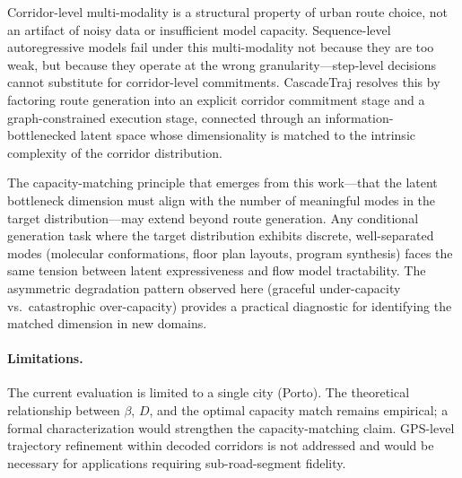 
Corridor-level multi-modality is a structural property of urban route choice, not an artifact of noisy data or insufficient model capacity.
Sequence-level autoregressive models fail under this multi-modality not because they are too weak, but because they operate at the wrong granularity---step-level decisions cannot substitute for corridor-level commitments.
CascadeTraj resolves this by factoring route generation into an explicit corridor commitment stage and a graph-constrained execution stage, connected through an information-bottlenecked latent space whose dimensionality is matched to the intrinsic complexity of the corridor distribution.

The capacity-matching principle that emerges from this work---that the latent bottleneck dimension must align with the number of meaningful modes in the target distribution---may extend beyond route generation.
Any conditional generation task where the target distribution exhibits discrete, well-separated modes (molecular conformations, floor plan layouts, program synthesis) faces the same tension between latent expressiveness and flow model tractability.
The asymmetric degradation pattern observed here (graceful under-capacity vs.\ catastrophic over-capacity) provides a practical diagnostic for identifying the matched dimension in new domains.

\paragraph{Limitations.}
The current evaluation is limited to a single city (Porto).
The theoretical relationship between $\beta$, $D$, and the optimal capacity match remains empirical; a formal characterization would strengthen the capacity-matching claim.
GPS-level trajectory refinement within decoded corridors is not addressed and would be necessary for applications requiring sub-road-segment fidelity.

